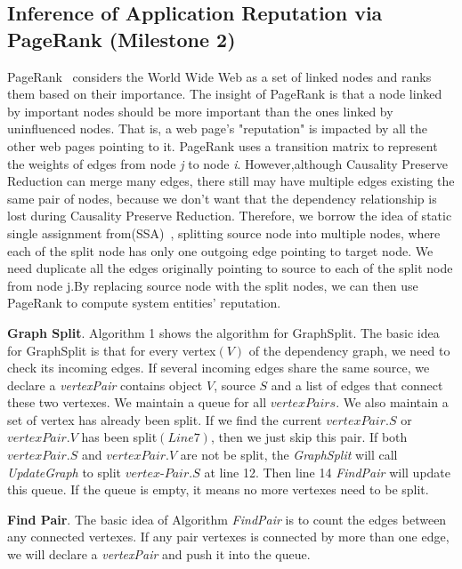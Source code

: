 \subsection{Inference of Application Reputation via\\PageRank (Milestone 2)}

PageRank~\cite{pagerank} considers the World Wide Web as a set of linked nodes and ranks them based on their importance. The insight of PageRank is that a node linked by important nodes should be more important than the ones linked by uninfluenced nodes. That is, a web page's "reputation" is impacted by all the other web pages pointing to it. PageRank uses a transition matrix to represent the weights of edges from node \textit{j} to node \textit{i}. However,although Causality Preserve Reduction can merge many edges, there still may have multiple edges existing the same pair of nodes, because we don't want that the dependency relationship is lost during Causality Preserve Reduction. Therefore, we borrow the idea of static single assignment from(SSA)~\cite{nielson2004principles}, splitting source node  into multiple nodes, where each of the split node has only one outgoing edge pointing to target node. We need duplicate all the edges originally pointing to source to each of the split node from node j.By replacing source node with the split nodes, we can then use PageRank to compute system entities' reputation.

\textbf{Graph Split}.
Algorithm 1 shows the algorithm for GraphSplit. 
The basic idea for GraphSplit is that for every vertex$(V)$ of the dependency graph, we need to check its incoming edges. If several incoming edges share the same source, we declare a \textit{vertexPair} contains object $V$, source $S$ and a list of edges that connect these two vertexes. We maintain a queue for all $vertexPairs$. We also maintain a set of vertex has already been split. If we find the current $vertexPair.S$ or $vertexPair.V$ has been split$(Line 7)$, then we just skip this pair. If both  $vertexPair.S$ and $vertexPair.V$  are not be split, the \textit{GraphSplit} will call \textit{UpdateGraph} to split $vertex$-$Pair.S$ at line 12. Then line 14 \textit{FindPair} will update this queue. If the queue is empty, it means no more vertexes need to be split.

\textbf{Find Pair}.
The basic idea of Algorithm \textit{FindPair} is to count the edges between any connected vertexes. If any pair vertexes is connected by more than one edge, we will declare a \textit{vertexPair} and push it into the queue. 

